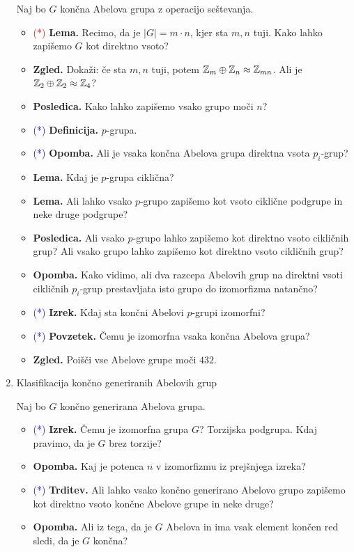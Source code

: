 \begin{enumerate}
    Naj bo \(G\) končna Abelova grupa z operacijo seštevanja.
    \begin{itemize}
        \item \textcolor{red}{(*)} \textbf{Lema.} Recimo, da je \(|G| = m \cdot n\), kjer sta \(m, n\) tuji. Kako lahko zapišemo \(G\) kot direktno vsoto?
        \item \textbf{Zgled.} Dokaži: če sta \(m, n\) tuji, potem \(\mathbb{Z}_m \oplus \mathbb{Z}_n \approx \mathbb{Z}_{mn}\). Ali je \(\mathbb{Z}_2 \oplus \mathbb{Z}_2 \approx \mathbb{Z}_4\)?
        \item \textbf{Posledica.} Kako lahko zapišemo vsako grupo moči \(n\)?
        \item \textcolor{blue}{(*)} \textbf{Definicija.} \(p\)-grupa.
        \item \textcolor{blue}{(*)} \textbf{Opomba.} Ali je vsaka končna Abelova grupa direktna vsota \(p_i\)-grup?
        \item \textbf{Lema.} Kdaj je \(p\)-grupa ciklična?
        \item \textbf{Lema.} Ali lahko vsako \(p\)-grupo zapišemo kot vsoto ciklične podgrupe in neke druge podgrupe?
        \item \textbf{Posledica.} Ali vsako \(p\)-grupo lahko zapišemo kot direktno vsoto cikličnih grup? Ali vsako grupo lahko zapišemo kot direktno vsoto cikličnih grup?
        \item \textbf{Opomba.} Kako vidimo, ali dva razcepa Abelovih grup na direktni vsoti cikličnih \(p_i\)-grup prestavljata isto grupo do izomorfizma natančno?
        \item \textcolor{blue}{(*)} \textbf{Izrek.} Kdaj sta končni Abelovi \(p\)-grupi izomorfni?
        \item \textcolor{blue}{(*)} \textbf{Povzetek.} Čemu je izomorfna vsaka končna Abelova grupa? \todo{*}
        \item \textbf{Zgled.} Poišči vse Abelove grupe moči \(432\).
    \end{itemize}

    \item Klasifikacija končno generiranih Abelovih grup
    
    Naj bo \(G\) končno generirana Abelova grupa.
    \begin{itemize}
        \item \textcolor{blue}{(*)} \textbf{Izrek.} Čemu je izomorfna grupa \(G\)? Torzijska podgrupa. Kdaj pravimo, da je \(G\) brez torzije?
        \item \textbf{Opomba.} Kaj je potenca \(n\) v izomorfizmu iz prejšnjega izreka?
        \item \textcolor{blue}{(*)} \textbf{Trditev.} Ali lahko vsako končno generirano Abelovo grupo zapišemo kot direktno vsoto končne Abelove grupe in neke druge?
        \item \textbf{Opomba.} Ali iz tega, da je \(G\) Abelova in ima vsak element končen red sledi, da je \(G\) končna?
    \end{itemize}


\end{enumerate}
